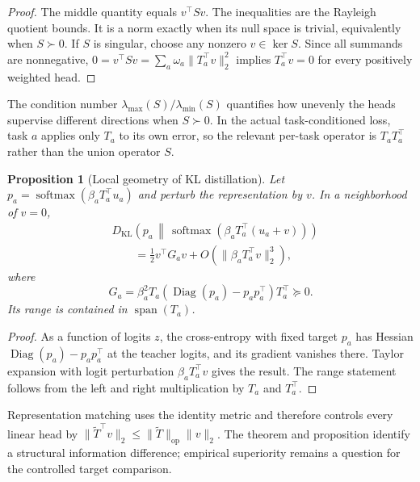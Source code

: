 \documentclass[letterpaper]{article} %
\theoremstyle{plain}
\newtheorem{proposition}[theorem]{Proposition}
\theoremstyle{definition}
\begin{document}
\begin{proof}
The middle quantity equals $v^\top Sv$. The inequalities are the Rayleigh quotient
bounds. It is a norm exactly when its null space is trivial, equivalently when
$S\succ0$. If $S$ is singular, choose any nonzero $v\in\ker S$. Since all summands are
nonnegative,
$0=v^\top Sv=\sum_a\omega_a\|T_a^\top v\|_2^2$ implies
$T_a^\top v=0$ for every positively weighted head.
\end{proof}

The condition number $\lambda_{\max}(S)/\lambda_{\min}(S)$ quantifies how unevenly the
heads supervise different directions when $S\succ0$. In the actual task-conditioned
loss, task $a$ applies only $T_a$ to its own error, so the relevant per-task operator is
$T_aT_a^\top$ rather than the union operator $S$.

\begin{proposition}[Local geometry of KL distillation]
\label{prop:kl-geometry}
Let $p_a=\operatorname{softmax}(\beta_aT_a^\top u_a)$ and perturb the representation by
$v$. In a neighborhood of $v=0$,
\begin{align}
&D_{\mathrm{KL}}\!\left(
 p_a\,\middle\|\,
 \operatorname{softmax}(\beta_aT_a^\top(u_a+v))
 \right) \\
&\qquad=
\frac12 v^\top G_a v
+O\!\left(\|\beta_aT_a^\top v\|_2^3\right),
\label{eq:kl-expansion}
\end{align}
where
\begin{equation}
G_a=\beta_a^2T_a
\left(\operatorname{Diag}(p_a)-p_ap_a^\top\right)T_a^\top\succeq0.
\label{eq:kl-metric}
\end{equation}
Its range is contained in $\operatorname{span}(T_a)$.
\end{proposition}

\begin{proof}
As a function of logits $z$, the cross-entropy with fixed target $p_a$ has Hessian
$\operatorname{Diag}(p_a)-p_ap_a^\top$ at the teacher logits, and its gradient vanishes
there. Taylor expansion with logit perturbation $\beta_aT_a^\top v$ gives the result.
The range statement follows from the left and right multiplication by $T_a$ and
$T_a^\top$.
\end{proof}

Representation matching uses the identity metric and therefore controls every linear
head by
$\|\widetilde T^\top v\|_2\le\|\widetilde T\|_{\mathrm{op}}\|v\|_2$.
The theorem and proposition identify a structural information difference; empirical
superiority remains a question for the controlled target comparison.
\end{document}
